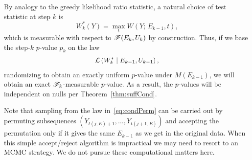 \documentclass{article}
\begin{document}
By analogy to the greedy likelihood ratio statistic, a natural choice of test statistic at step $k$ is
\[
W_k^*(Y) = \max_t W(Y; \, E_{k-1}, t),
\]
which is measurable with respect to $\mathscr{F}(E_k, U_k)$ by construction. Thus, if we base the step-$k$ $p$-value $p_k$ on the law
\begin{equation}\label{eq:condPerm}
\mathcal{L}\left(W_k^* \mid E_{k-1}, U_{k-1}\right),
\end{equation}
randomizing to obtain an exactly uniform $p$-value under $M(E_{k-1})$, we will obtain an exact $\mathscr{F}_k$-measurable $p$-value. As a result, the $p$-values will be independent on nulls per Theorem~\ref{thm:suffCond}.

Note that sampling from the law in~\eqref{eq:condPerm} can be carried out by permuting subsequences $(Y_{t(j,E)+1}, \ldots, Y_{t(j+1,E)})$ and accepting the permutation only if it gives the same $E_{k-1}$ as we get in the original data. When this simple accept/reject algorithm is impractical we may need to resort to an MCMC strategy. We do not pursue these computational matters here.
\end{document}
